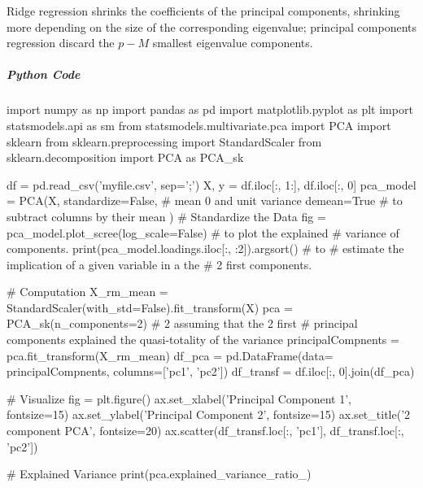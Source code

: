 Ridge regression shrinks the coefficients of the principal components,
shrinking more depending on the size of the corresponding eigenvalue;
principal components regression discard the $p-M$ smallest eigenvalue
components.\\
\subparagraph{Python Code}
\begin{python}
import numpy as np
import pandas as pd
import matplotlib.pyplot as plt
import statsmodels.api as sm
from statsmodels.multivariate.pca import PCA
import sklearn
from sklearn.preprocessing import StandardScaler
from sklearn.decomposition import PCA as PCA_sk

df = pd.read_csv('myfile.csv', sep=';')
X, y = df.iloc[:, 1:], df.iloc[:, 0]
pca_model = PCA(X,
    standardize=False, # mean 0 and unit variance
    demean=True # to subtract columns by their mean
)
# Standardize the Data
fig = pca_model.plot_scree(log_scale=False) # to plot the explained
# variance of components.
print(pca_model.loadings.iloc[:, :2]).argsort() # to
# estimate the implication of a given variable in a the
# 2 first components.

# Computation
X_rm_mean = StandardScaler(with_std=False).fit_transform(X)
pca = PCA_sk(n_components=2) # 2 assuming that the 2 first 
# principal components explained the quasi-totality of the variance
principalCompnents = pca.fit_transform(X_rm_mean)
df_pca = pd.DataFrame(data= principalCompnents,
    columns=['pc1', 'pc2'])
df_transf = df.iloc[:, 0].join(df_pca)

# Visualize
fig = plt.figure()
ax.set_xlabel('Principal Component 1', fontsize=15)
ax.set_ylabel('Principal Component 2', fontsize=15)
ax.set_title('2 component PCA', fontsize=20)
ax.scatter(df_transf.loc[:, 'pc1'], df_transf.loc[:, 'pc2'])

# Explained Variance
print(pca.explained_variance_ratio_)
\end{python}

